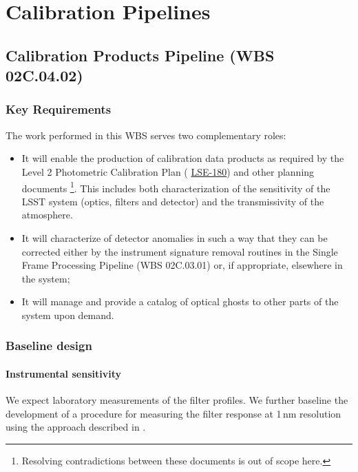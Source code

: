 \documentclass[12pt]{article}
\newcommand{\ds}[2]{{\color{blue} \href{https://docushare.lsstcorp.org/docushare/dsweb/Get/#1}{#2}}\xspace}
\newcommand{\NewPCP}{\ds{LSE-180}{LSE-180}}
\newcommand{\wbsSFM}{WBS 02C.03.01}
\newcommand{\wbsCPP}{WBS 02C.04.02}
\begin{document}
\clearpage

\section{Calibration Pipelines}

\subsection{Calibration Products Pipeline (\wbsCPP)}

\subsubsection{Key Requirements}

The work performed in this WBS serves two complementary roles:

\begin{itemize}
  \item{It will enable the production of calibration data products as required by the Level 2 Photometric Calibration Plan (\NewPCP{}) and other planning documents \cite{Lupton15}\footnote{Resolving contradictions between these documents is out of scope here.}. This includes both characterization of the sensitivity of the LSST system (optics, filters and detector) and the transmissivity of the atmosphere.}
  \item{It will characterize of detector anomalies in such a way that they can be corrected either by the instrument signature removal routines in the Single Frame Processing Pipeline (\wbsSFM) or, if appropriate, elsewhere in the system;}
  \item{It will manage and provide a catalog of optical ghosts to other parts of the system upon demand.}
\end{itemize}

\subsubsection{Baseline design}

\paragraph{Instrumental sensitivity}

We expect laboratory measurements of the filter profiles. We further baseline the development of a procedure for measuring the filter response at 1\,nm resolution using the approach described in \cite{Lupton15}.
\end{document}
